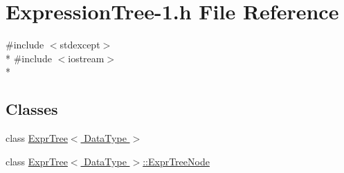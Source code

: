 \hypertarget{_expression_tree-1_8h}{\section{Expression\+Tree-\/1.h File Reference}
\label{_expression_tree-1_8h}
}
{\ttfamily \#include $<$stdexcept$>$}\\*
{\ttfamily \#include $<$iostream$>$}\\*
\subsection*{Classes}
\begin{DoxyCompactItemize}
\item 
class \hyperlink{class_expr_tree}{Expr\+Tree$<$ Data\+Type $>$}
\item 
class \hyperlink{class_expr_tree_1_1_expr_tree_node}{Expr\+Tree$<$ Data\+Type $>$\+::\+Expr\+Tree\+Node}
\end{DoxyCompactItemize}
